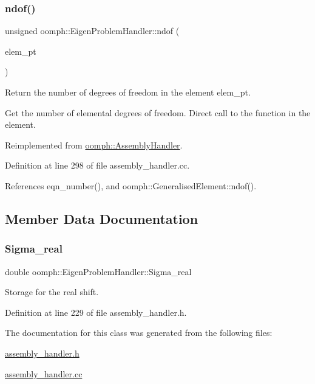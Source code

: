\subsubsection{\texorpdfstring{ndof()}{ndof()}}
{\footnotesize\ttfamily unsigned oomph\+::\+Eigen\+Problem\+Handler\+::ndof (\begin{DoxyParamCaption}\item[{\hyperlink{classoomph_1_1GeneralisedElement}{Generalised\+Element} $\ast$const \&}]{elem\+\_\+pt }\end{DoxyParamCaption})\hspace{0.3cm}{\ttfamily [virtual]}}



Return the number of degrees of freedom in the element elem\+\_\+pt. 

Get the number of elemental degrees of freedom. Direct call to the function in the element. 

Reimplemented from \hyperlink{classoomph_1_1AssemblyHandler_a09213be8f4aa009e0366460a7ed78e68}{oomph\+::\+Assembly\+Handler}.



Definition at line 298 of file assembly\+\_\+handler.\+cc.



References eqn\+\_\+number(), and oomph\+::\+Generalised\+Element\+::ndof().



\subsection{Member Data Documentation}
\mbox{\label{classoomph_1_1EigenProblemHandler_a1fc4ffdc95087fae83ddfd61004f6c83}} 
\subsubsection{\texorpdfstring{Sigma\+\_\+real}{Sigma\_real}}
{\footnotesize\ttfamily double oomph\+::\+Eigen\+Problem\+Handler\+::\+Sigma\+\_\+real\hspace{0.3cm}{\ttfamily [private]}}



Storage for the real shift. 



Definition at line 229 of file assembly\+\_\+handler.\+h.



The documentation for this class was generated from the following files\+:\begin{DoxyCompactItemize}
\item 
\hyperlink{assembly__handler_8h}{assembly\+\_\+handler.\+h}\item 
\hyperlink{assembly__handler_8cc}{assembly\+\_\+handler.\+cc}\end{DoxyCompactItemize}
